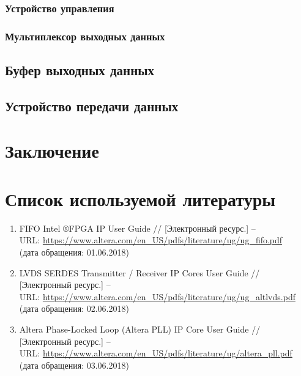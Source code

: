 \subsubsection{Устройство управления}

\subsubsection{Мультиплексор выходных данных}

\subsection{Буфер выходных данных}

\subsection{Устройство передачи данных}

\newpage

\section*{Заключение}

\newpage

\section*{Список используемой литературы}

\begin{enumerate}
	\item FIFO Intel ®FPGA IP User Guide // [Электронный ресурс.] --\\
	URL: \href{https://www.altera.com/en_US/pdfs/literature/ug/ug_fifo.pdf}{https://www.altera.com/en\_US/pdfs/literature/ug/ug\_fifo.pdf}\\
	(дата обращения: 01.06.2018)
	\item LVDS SERDES Transmitter / Receiver IP Cores User Guide // [Электронный ресурс.] --\\
	URL: \href{https://www.altera.com/en_US/pdfs/literature/ug/ug_altlvds.pdf}{https://www.altera.com/en\_US/pdfs/literature/ug/ug\_altlvds.pdf}\\
	(дата обращения: 02.06.2018)
	\item Altera Phase-Locked Loop (Altera PLL) IP Core User Guide // [Электронный ресурс.] --\\
	URL: \href{https://www.altera.com/en_US/pdfs/literature/ug/altera_pll.pdf}{https://www.altera.com/en\_US/pdfs/literature/ug/altera\_pll.pdf}\\
	(дата обращения: 03.06.2018)
\end{enumerate}


